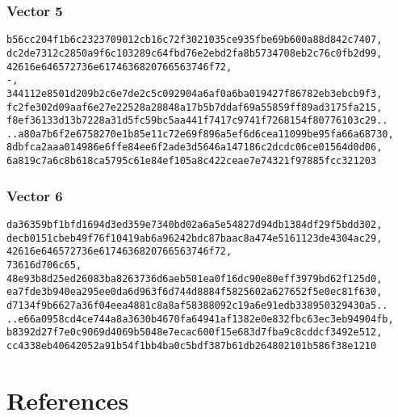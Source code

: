 \documentclass[
]{article}
\begin{document}
\hypertarget{vector-5}{%
\subsubsection{Vector 5}\label{vector-5}}

\begin{verbatim}
b56cc204f1b6c2323709012cb16c72f3021035ce935fbe69b600a88d842c7407,
dc2de7312c2850a9f6c103289c64fbd76e2ebd2fa8b5734708eb2c76c0fb2d99,
42616e646572736e6174636820766563746f72,
-,
344112e8501d209b2c6e7de2c5c092904a6af0a6ba019427f86782eb3ebcb9f3,
fc2fe302d09aaf6e27e22528a28848a17b5b7ddaf69a55859ff89ad3175fa215,
f8ef36133d13b7228a31d5fc59bc5aa441f7417c9741f7268154f80776103c29..
..a80a7b6f2e6758270e1b85e11c72e69f896a5ef6d6cea11099be95fa66a68730,
8dbfca2aaa014986e6ffe84ee6f2ade3d5646a147186c2dcdc06ce01564d0d06,
6a819c7a6c8b618ca5795c61e84ef105a8c422ceae7e74321f97885fcc321203
\end{verbatim}

\hypertarget{vector-6}{%
\subsubsection{Vector 6}\label{vector-6}}

\begin{verbatim}
da36359bf1bfd1694d3ed359e7340bd02a6a5e54827d94db1384df29f5bdd302,
decb0151cbeb49f76f10419ab6a96242bdc87baac8a474e5161123de4304ac29,
42616e646572736e6174636820766563746f72,
73616d706c65,
48e93b8d25ed26083ba8263736d6aeb501ea0f16dc90e80eff3979bd62f125d0,
ea7fde3b940ea295ee0da6d963f6d744d8884f5825602a627652f5e0ec81f630,
d7134f9b6627a36f04eea4881c8a8af58388092c19a6e91edb338950329430a5..
..e66a0958cd4ce744a8a3630b4670fa64941af1382e0e832fbc63ec3eb94904fb,
b8392d27f7e0c9069d4069b5048e7ecac600f15e683d7fba9c8cddcf3492e512,
cc4338eb40642052a91b54f1bb4ba0c5bdf387b61db264802101b586f38e1210
\end{verbatim}

\hypertarget{references}{%
\section*{References}\label{references}}
\end{document}
